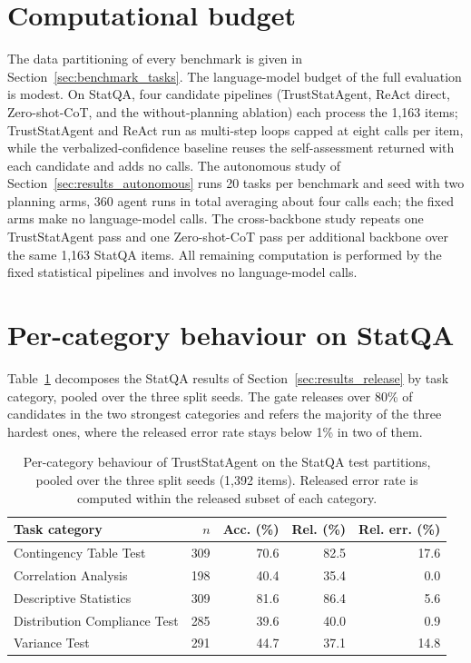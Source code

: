 \documentclass[preprint,12pt,authoryear]{elsarticle}
\begin{document}
\section{Computational budget}
\label{app:budget}


The data partitioning of every benchmark is given in Section~\ref{sec:benchmark_tasks}.
The language-model budget of the full evaluation is modest.
On StatQA, four candidate pipelines (TrustStatAgent, ReAct direct, Zero-shot-CoT, and the without-planning ablation) each process the 1{,}163 items; TrustStatAgent and ReAct run as multi-step loops capped at eight calls per item, while the verbalized-confidence baseline reuses the self-assessment returned with each candidate and adds no calls.
The autonomous study of Section~\ref{sec:results_autonomous} runs 20 tasks per benchmark and seed with two planning arms, 360 agent runs in total averaging about four calls each; the fixed arms make no language-model calls.
The cross-backbone study repeats one TrustStatAgent pass and one Zero-shot-CoT pass per additional backbone over the same 1{,}163 StatQA items.
All remaining computation is performed by the fixed statistical pipelines and involves no language-model calls.


\section{Per-category behaviour on StatQA}
\label{app:category}


Table~\ref{tab:statqa_categories} decomposes the StatQA results of Section~\ref{sec:results_release} by task category, pooled over the three split seeds.
The gate releases over 80\% of candidates in the two strongest categories and refers the majority of the three hardest ones, where the released error rate stays below 1\% in two of them.


\begin{table}[H]
    \centering
    \caption{Per-category behaviour of TrustStatAgent on the StatQA test partitions, pooled over the three split seeds (1{,}392 items). Released error rate is computed within the released subset of each category.}
    \label{tab:statqa_categories}
    \small
    \setlength{\tabcolsep}{7pt}
    \renewcommand{\arraystretch}{1.15}
    \begin{tabular}{@{}lrrrr@{}}
        \toprule
        \textbf{Task category} & \textbf{$n$} & \textbf{Acc. (\%)} & \textbf{Rel. (\%)} & \textbf{Rel. err. (\%)} \\
        \midrule
        Contingency Table Test & 309 & 70.6 & 82.5 & 17.6 \\
        Correlation Analysis & 198 & 40.4 & 35.4 & 0.0 \\
        Descriptive Statistics & 309 & 81.6 & 86.4 & 5.6 \\
        Distribution Compliance Test & 285 & 39.6 & 40.0 & 0.9 \\
        Variance Test & 291 & 44.7 & 37.1 & 14.8 \\
        \bottomrule
    \end{tabular}
\end{table}



\end{document}
